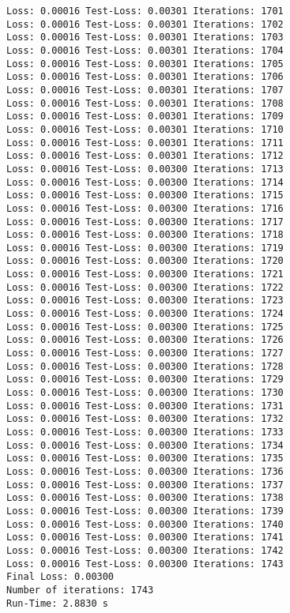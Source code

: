 \documentclass[11pt]{article}
\begin{document}
\begin{Verbatim}[commandchars=\\\{\}]
Loss: 0.00016 Test-Loss: 0.00301 Iterations: 1701
Loss: 0.00016 Test-Loss: 0.00301 Iterations: 1702
Loss: 0.00016 Test-Loss: 0.00301 Iterations: 1703
Loss: 0.00016 Test-Loss: 0.00301 Iterations: 1704
Loss: 0.00016 Test-Loss: 0.00301 Iterations: 1705
Loss: 0.00016 Test-Loss: 0.00301 Iterations: 1706
Loss: 0.00016 Test-Loss: 0.00301 Iterations: 1707
Loss: 0.00016 Test-Loss: 0.00301 Iterations: 1708
Loss: 0.00016 Test-Loss: 0.00301 Iterations: 1709
Loss: 0.00016 Test-Loss: 0.00301 Iterations: 1710
Loss: 0.00016 Test-Loss: 0.00301 Iterations: 1711
Loss: 0.00016 Test-Loss: 0.00301 Iterations: 1712
Loss: 0.00016 Test-Loss: 0.00300 Iterations: 1713
Loss: 0.00016 Test-Loss: 0.00300 Iterations: 1714
Loss: 0.00016 Test-Loss: 0.00300 Iterations: 1715
Loss: 0.00016 Test-Loss: 0.00300 Iterations: 1716
Loss: 0.00016 Test-Loss: 0.00300 Iterations: 1717
Loss: 0.00016 Test-Loss: 0.00300 Iterations: 1718
Loss: 0.00016 Test-Loss: 0.00300 Iterations: 1719
Loss: 0.00016 Test-Loss: 0.00300 Iterations: 1720
Loss: 0.00016 Test-Loss: 0.00300 Iterations: 1721
Loss: 0.00016 Test-Loss: 0.00300 Iterations: 1722
Loss: 0.00016 Test-Loss: 0.00300 Iterations: 1723
Loss: 0.00016 Test-Loss: 0.00300 Iterations: 1724
Loss: 0.00016 Test-Loss: 0.00300 Iterations: 1725
Loss: 0.00016 Test-Loss: 0.00300 Iterations: 1726
Loss: 0.00016 Test-Loss: 0.00300 Iterations: 1727
Loss: 0.00016 Test-Loss: 0.00300 Iterations: 1728
Loss: 0.00016 Test-Loss: 0.00300 Iterations: 1729
Loss: 0.00016 Test-Loss: 0.00300 Iterations: 1730
Loss: 0.00016 Test-Loss: 0.00300 Iterations: 1731
Loss: 0.00016 Test-Loss: 0.00300 Iterations: 1732
Loss: 0.00016 Test-Loss: 0.00300 Iterations: 1733
Loss: 0.00016 Test-Loss: 0.00300 Iterations: 1734
Loss: 0.00016 Test-Loss: 0.00300 Iterations: 1735
Loss: 0.00016 Test-Loss: 0.00300 Iterations: 1736
Loss: 0.00016 Test-Loss: 0.00300 Iterations: 1737
Loss: 0.00016 Test-Loss: 0.00300 Iterations: 1738
Loss: 0.00016 Test-Loss: 0.00300 Iterations: 1739
Loss: 0.00016 Test-Loss: 0.00300 Iterations: 1740
Loss: 0.00016 Test-Loss: 0.00300 Iterations: 1741
Loss: 0.00016 Test-Loss: 0.00300 Iterations: 1742
Loss: 0.00016 Test-Loss: 0.00300 Iterations: 1743
Final Loss: 0.00300
Number of iterations: 1743
Run-Time: 2.8830 s
    \end{Verbatim}
\end{document}
